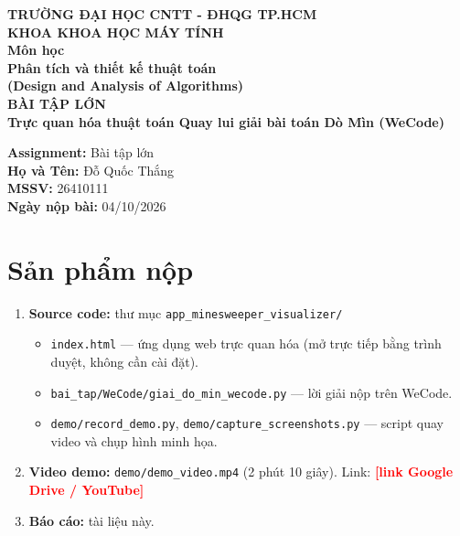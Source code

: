 \documentclass[12pt,a4paper]{article}
\newcommand{\todo}[1]{\textcolor{red}{\textbf{[#1]}}}
\begin{document}
\begin{center}
    \textbf{TRƯỜNG ĐẠI HỌC CNTT - ĐHQG TP.HCM} \\
    \textbf{KHOA KHOA HỌC MÁY TÍNH} \\
    \vspace{1.5cm}
    \textbf{Môn học} \\
    \textbf{Phân tích và thiết kế thuật toán} \\
    \textbf{(Design and Analysis of Algorithms)} \\
    \vspace{1.5cm}
    {\Large \textbf{BÀI TẬP LỚN}} \\[4pt]
    {\large \textbf{Trực quan hóa thuật toán Quay lui giải bài toán Dò Mìn (WeCode)}}
\end{center}

\vfill
\noindent
\textbf{Assignment:} Bài tập lớn \\
\textbf{Họ và Tên:} Đỗ Quốc Thắng \\
\textbf{MSSV:} 26410111 \\
\textbf{Ngày nộp bài:} 04/10/2026

\newpage
\tableofcontents
\newpage

\section{Sản phẩm nộp}

\begin{enumerate}
    \item \textbf{Source code:} thư mục \texttt{app\_minesweeper\_visualizer/}
    \begin{itemize}
        \item \texttt{index.html} --- ứng dụng web trực quan hóa (mở trực tiếp bằng trình duyệt, không cần cài đặt).
        \item \texttt{bai\_tap/WeCode/giai\_do\_min\_wecode.py} --- lời giải nộp trên WeCode.
        \item \texttt{demo/record\_demo.py}, \texttt{demo/capture\_screenshots.py} --- script quay video và chụp hình minh họa.
    \end{itemize}
    \item \textbf{Video demo:} \texttt{demo/demo\_video.mp4} (2 phút 10 giây). Link: \todo{link Google Drive / YouTube}
    \item \textbf{Báo cáo:} tài liệu này.
\end{enumerate}
\end{document}
